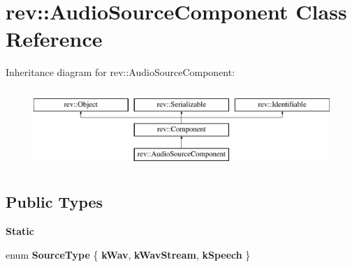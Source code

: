 \hypertarget{classrev_1_1_audio_source_component}{}\section{rev\+::Audio\+Source\+Component Class Reference}
\label{classrev_1_1_audio_source_component}
Inheritance diagram for rev\+::Audio\+Source\+Component\+:\begin{figure}[H]
\begin{center}
\leavevmode
\includegraphics[height=3.000000cm]{classrev_1_1_audio_source_component}
\end{center}
\end{figure}
\subsection*{Public Types}
\begin{Indent}\textbf{ Static}\par
\begin{DoxyCompactItemize}
\item 
\mbox{\label{classrev_1_1_audio_source_component_aaeec6ffb7fc9de18021ce4911f99d44f}} 
enum {\bfseries Source\+Type} \{ {\bfseries k\+Wav}, 
{\bfseries k\+Wav\+Stream}, 
{\bfseries k\+Speech}
 \}
\end{DoxyCompactItemize}
\end{Indent}
